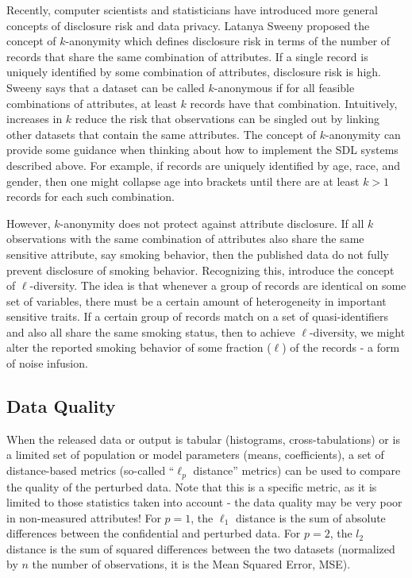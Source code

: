 \documentclass[
]{book}
\begin{document}
Recently, computer scientists and statisticians have introduced more general concepts of disclosure risk and data privacy. Latanya Sweeny proposed the concept of \(k\)-anonymity \citep{sweeney_achieving_2002} which defines disclosure risk in terms of the number of records that share the same combination of attributes. If a single record is uniquely identified by some combination of attributes, disclosure risk is high. Sweeny says that a dataset can be called \(k\)-anonymous if for all feasible combinations of attributes, at least \(k\) records have that combination. Intuitively, increases in \(k\) reduce the risk that observations can be singled out by linking other datasets that contain the same attributes.
The concept of \(k\)-anonymity can provide some guidance when thinking about how to implement the SDL systems described above. For example, if records are uniquely identified by age, race, and gender, then one might collapse age into brackets until there are at least \(k>1\) records for each such combination.

However, \(k\)-anonymity does not protect against attribute disclosure. If all \(k\) observations with the same combination of attributes also share the same sensitive attribute, say smoking behavior, then the published data do not fully prevent disclosure of smoking behavior. Recognizing this, \citet{machanavajjhala_l-diversity_2007} introduce the concept of \(\ell\)-diversity. The idea is that whenever a group of records are identical on some set of variables, there must be a certain amount of heterogeneity in important sensitive traits. If a certain group of records match on a set of quasi-identifiers and also all share the same smoking status, then to achieve \(\ell\)-diversity, we might alter the reported smoking behavior of some fraction (\(\ell\)) of the records - a form of noise infusion.

\hypertarget{data-quality}{%
\subsection{Data Quality}\label{data-quality}}

When the released data or output is tabular (histograms, cross-tabulations) or is a limited set of population or model parameters (means, coefficients), a set of distance-based metrics (so-called ``\(\ell_p\) distance'' metrics) can be used to compare the quality of the perturbed data. Note that this is a specific metric, as it is limited to those statistics taken into account - the data quality may be very poor in non-measured attributes! For \(p=1\), the \(\ell_1\) distance is the sum of absolute differences between the confidential and perturbed data. For \(p = 2\), the \(l_2\) distance is the sum of squared differences between the two datasets (normalized by \(n\) the number of observations, it is the Mean Squared Error, MSE).
\end{document}
